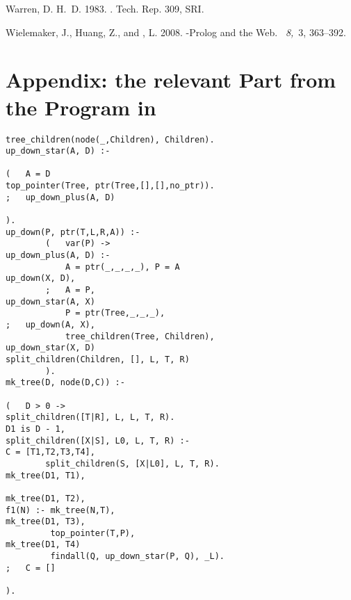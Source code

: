 \documentclass{tlp}
\begin{document}
\begin{thebibliography}{}
{\sc Warren, D. H.~D.} 1983.
.
\newblock Tech. Rep. 309, SRI.

{\sc Wielemaker, J.}, {\sc Huang, Z.}, {\sc and} {, L.} 2008.
-{P}rolog and the {W}eb.
~{\em 8,\/}~3,
  363--392.

\end{thebibliography}








\section*{Appendix: the relevant Part from the Program in \cite{OKeefePearl}}

\begin{Verbatim}[fontsize=\scriptsize, frame=single,samepage=true]
tree_children(node(_,Children), Children).                          up_down_star(A, D) :-
                                                                            (   A = D
top_pointer(Tree, ptr(Tree,[],[],no_ptr)).                                  ;   up_down_plus(A, D)
                                                                            ).
up_down(P, ptr(T,L,R,A)) :-                                         
        (   var(P) ->                                               up_down_plus(A, D) :-
            A = ptr(_,_,_,_), P = A                                                               up_down(X, D),
        ;   A = P,                                                              up_down_star(A, X)
            P = ptr(Tree,_,_,_),                                            ;   up_down(A, X),
            tree_children(Tree, Children),                                      up_down_star(X, D)
split_children(Children, [], L, T, R)                   
        ).                                                          mk_tree(D, node(D,C)) :-
                                                                            (   D > 0 ->
split_children([T|R], L, L, T, R).                                              D1 is D - 1,
split_children([X|S], L0, L, T, R) :-                                           C = [T1,T2,T3,T4],
        split_children(S, [X|L0], L, T, R).                                     mk_tree(D1, T1),
                                                                                mk_tree(D1, T2),
f1(N) :- mk_tree(N,T),                                                          mk_tree(D1, T3),
         top_pointer(T,P),                                                      mk_tree(D1, T4)
         findall(Q, up_down_star(P, Q), _L).                                ;   C = []
                                                                            ).
\end{Verbatim}
\end{document}
